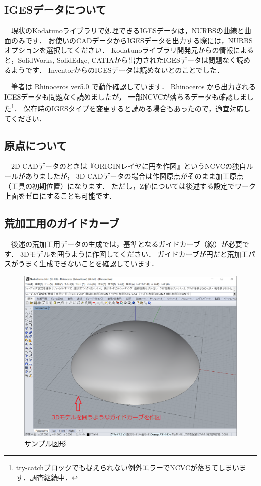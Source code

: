 \subsection{IGESデータについて}
\label{sec:AboutIGES}
　現状のKodatunoライブラリで処理できるIGESデータは，NURBSの曲線と曲面のみです．
お使いのCADデータからIGESデータを出力する際には，NURBSオプションを選択してください．
Kodatunoライブラリ開発元からの情報によると，SolidWorks, SolidEdge, CATIAから出力されたIGESデータは問題なく読めるようです．
InventorからのIGESデータは読めないとのことでした．

　筆者は Rhinoceros ver5.0 で動作確認しています．
Rhinoceros から出力されるIGESデータも問題なく読めましたが，
一部NCVCが落ちるデータも確認しました\footnote{try-catchブロックでも捉えられない例外エラーでNCVCが落ちてしまいます．調査継続中．}．
保存時のIGESタイプを変更すると読める場合もあったので，適宜対応してください．

\subsection{原点について}
　2D-CADデータのときは『ORIGINレイヤに円を作図』というNCVCの独自ルールがありましたが，
3D-CADデータの場合は作図原点がそのまま加工原点（工具の初期位置）になります．
ただし，Z値については後述する設定でワーク上面をゼロにすることも可能です．

\subsection{荒加工用のガイドカーブ}
　後述の荒加工用データの生成では，基準となるガイドカーブ（線）が必要です．
3Dモデルを囲うように作図してください．
ガイドカーブが円だと荒加工パスがうまく生成できないことを確認しています．

\begin{figure}[H]
\centering
\includegraphics[scale=0.5]{No1/fig/fig11.png}
\caption{サンプル図形}
\label{fig:sample.iges}
\end{figure}


